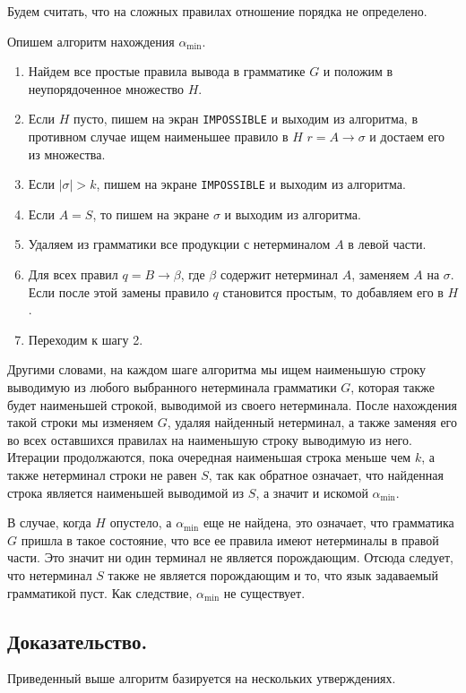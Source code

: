 \documentclass[12pt]{article}
\begin{document}
Будем считать, что на сложных правилах отношение порядка не определено.

Опишем алгоритм нахождения $ \alpha_{\min} $.
\begin{enumerate}
    \item Найдем все простые правила вывода в грамматике $ G $ и положим
          в неупорядоченное множество $ H $.
    \item Если $ H $ пусто, пишем на экран \verb|IMPOSSIBLE| и выходим из
          алгоритма, в противном случае ищем наименьшее правило в $ H $
          $ r = A \rightarrow \sigma $ и достаем его из множества.
    \item Если $ |\sigma| > k $, пишем на экране \verb|IMPOSSIBLE| и выходим
          из алгоритма.
    \item Если $ A = S $, то пишем на экране $ \sigma $ и выходим из
          алгоритма.
    \item Удаляем из грамматики все продукции с нетерминалом $ A $ в левой
          части.
    \item Для всех правил $ q = B \rightarrow \beta $, где $ \beta $ содержит
          нетерминал $ A $, заменяем $ A $ на $ \sigma $. Если после этой
          замены правило $ q $ становится простым, то добавляем его в $ H $.
    \item Переходим к шагу 2.
\end{enumerate}

Другими словами, на каждом шаге алгоритма мы ищем наименьшую строку
выводимую из любого выбранного нетерминала грамматики $ G $, которая также
будет наименьшей строкой, выводимой из своего нетерминала. После нахождения
такой строки мы изменяем $ G $, удаляя найденный нетерминал, а также заменяя
его во всех оставшихся правилах на наименьшую строку выводимую из него.
Итерации продолжаются, пока очередная наименьшая строка меньше чем $ k $, а
также нетерминал строки не равен $ S $, так как обратное означает, что
найденная строка является наименьшей выводимой из $ S $, а значит и искомой
$ \alpha_{\min} $.

В случае, когда $ H $ опустело, а $ \alpha_{\min} $ еще не найдена,
это означает, что грамматика $ G $ пришла в такое состояние, что все ее
правила имеют нетерминалы в правой части. Это значит ни один терминал не
является порождающим. Отсюда следует, что нетерминал $ S $ также не является
порождающим и то, что язык задаваемый грамматикой пуст. Как следствие,
$ \alpha_{\min} $ не существует.


\subsection{Доказательство.}
Приведенный выше алгоритм базируется на нескольких утверждениях.
\end{document}
